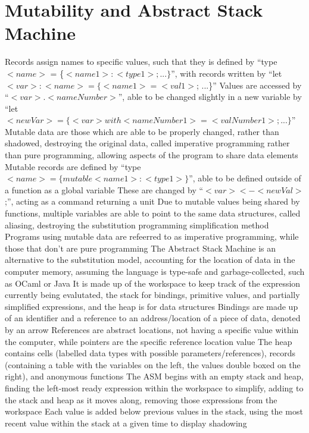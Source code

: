 \documentclass[11 pt, twoside]{article}
\newenvironment{outline*}
{
	\begin{outline}[enumerate]
	}
	{\end{outline}
}
\begin{document}
\section{Mutability and Abstract Stack Machine}
\begin{outline*}
\1 Records assign names to specific values, such that they is defined by ``type $<name>$ = \{$<name1>:<type1>; ...\}$'', with records written by ``let $<var>: <name> = \{<name1> = <val1>$; ...\}''
	\2 Values are accessed by ``$<var>.<nameNumber>$'', able to be changed slightly in a new variable by ``let $<newVar> = \{<var> with <nameNumber1>=<valNumber1>; ...\}$''
\1 Mutable data are those which are able to be properly changed, rather than shadowed, destroying the original data, called imperative programming rather than pure programming, allowing aspects of the program to share data elements
	\2 Mutable records are defined by ``type $<name> = \{mutable <name1> : <type1>\}$'', able to be defined outside of a function as a global variable
	\2 These are changed by ``$<var> <- <newVal>$;'', acting as a command returning a unit
	\2 Due to mutable values being shared by functions, multiple variables are able to point to the same data structures, called aliasing, destroying the substitution programming simplification method
	\2 Programs using mutable data are refeerred to as imperative programming, while those that don't are pure programming
\1 The Abstract Stack Machine is an alternative to the substitution model, accounting for the location of data in the computer memory, assuming the language is type-safe and garbage-collected, such as OCaml or Java
	\2 It is made up of the workspace to keep track of the expression currently being evalutated, the stack for bindings, primitive values, and partially simplified expressions, and the heap is for data structures
		\3 Bindings are made up of an identifier and a reference to an address/location of a piece of data, denoted by an arrow
			\4 References are abstract locations, not having a specific value within the computer, while pointers are the specific reference location value
		\3 The heap contains cells (labelled data types with possible parameters/references), records (containing a table with the variables on the left, the values double boxed on the right), and anonymous functions
	\2 The ASM begins with an empty stack and heap, finding the left-most ready expression within the workspace to simplify, adding to the stack and heap as it moves along, removing those expressions from the workspace
		\3 Each value is added below previous values in the stack, using the most recent value within the stack at a given time to display shadowing

\end{outline*}
\end{document}
